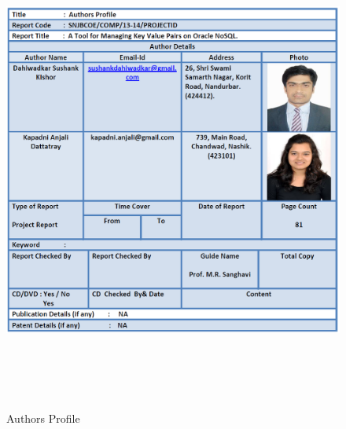 \begin{figure}[h]
\centering
  \includegraphics[width=17cm,height=16cm]{AP.png}
  \caption{Authors Profile}\label{Authors Profile}
\end{figure}
